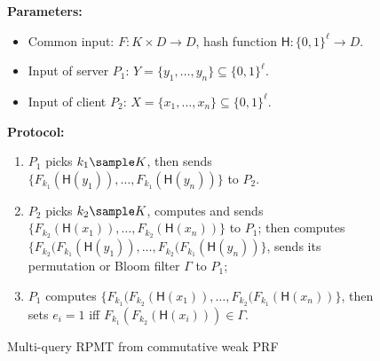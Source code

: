 \documentclass[a4paper,10pt]{article}
\begin{document}
\begin{figure}[!hbtp]
\begin{framed}
\begin{minipage}[center]{\textwidth}
\begin{trivlist}
\item \textbf{Parameters:} 
\begin{itemize}
    \item Common input: $F: K \times D \rightarrow D$, hash function $\mathsf{H}: \{0,1\}^\ell \rightarrow D$. 

    \item Input of server $P_1$: $Y = \{y_1, \dots, y_n\} \subseteq \{0,1\}^\ell$.

    \item Input of client $P_2$: $X = \{x_1, \dots, x_n\} \subseteq \{0,1\}^\ell$.
\end{itemize}

\item \textbf{Protocol:}

\begin{enumerate}
\item $P_1$ picks $k_1 \sample K$, 
    then sends $\{F_{k_1}(\mathsf{H}(y_1)), \dots, F_{k_1}(\mathsf{H}(y_n))\}$ to $P_2$. 

\item $P_2$ picks $k_2 \sample K$, 
    computes and sends $\{F_{k_2}(\mathsf{H}(x_1)), \dots, F_{k_2}(\mathsf{H}(x_n))\}$ to $P_1$; 
    then computes $\{F_{k_2}(F_{k_1}(\mathsf{H}(y_1)), \dots, F_{k_2}(F_{k_1}(\mathsf{H}(y_n))\}$, 
    sends its permutation or Bloom filter $\Gamma$ to $P_1$; 

\item $P_1$ computes $\{F_{k_1}(F_{k_2}(\mathsf{H}(x_1)), \dots, F_{k_2}(F_{k_1}(\mathsf{H}(x_n))\}$, 
    then sets $e_i = 1$ iff $F_{k_1}(F_{k_2}(\mathsf{H}(x_i))) \in \Gamma$.   
\end{enumerate}
\end{trivlist}
\end{minipage}
\end{framed}
\caption{Multi-query RPMT from commutative weak PRF}\label{fig:RPMT-from-cwPRF}
\end{figure} 
\end{document}
